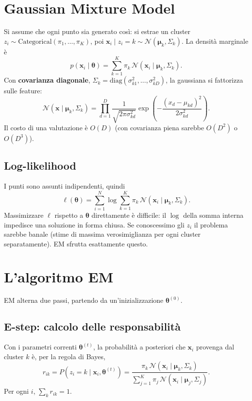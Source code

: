 \documentclass[11pt,a4paper]{article}
\newcommand{\bx}{\mathbf{x}}
\newcommand{\bmu}{\boldsymbol{\mu}}
\newcommand{\bth}{\boldsymbol{\theta}}
\newcommand{\Nrm}{\mathcal{N}}
\theoremstyle{definition}
\begin{document}
\section{Gaussian Mixture Model}
Si assume che ogni punto sia generato così: si estrae un cluster
$z_i\sim\mathrm{Categorical}(\pi_1,\dots,\pi_K)$, poi
$\bx_i\mid z_i=k\sim\Nrm(\bmu_k,\Sigma_k)$. La densità marginale è
\begin{equation}
p(\bx_i\mid\bth)=\sum_{k=1}^{K}\pi_k\,\Nrm(\bx_i\mid\bmu_k,\Sigma_k).
\end{equation}
Con \textbf{covarianza diagonale}, $\Sigma_k=\mathrm{diag}(\sigma_{k1}^2,\dots,\sigma_{kD}^2)$, la
gaussiana si fattorizza sulle feature:
\begin{equation}
\Nrm(\bx\mid\bmu_k,\Sigma_k)=\prod_{d=1}^{D}\frac{1}{\sqrt{2\pi\sigma_{kd}^2}}
\exp\!\left(-\frac{(x_d-\mu_{kd})^2}{2\sigma_{kd}^2}\right).
\label{eq:gauss}
\end{equation}
Il costo di una valutazione è $O(D)$ (con covarianza piena sarebbe $O(D^2)$ o
$O(D^3)$).

\subsection{Log-likelihood}
I punti sono assunti indipendenti, quindi
\begin{equation}
\ell(\bth)=\sum_{i=1}^{N}\log\sum_{k=1}^{K}\pi_k\,\Nrm(\bx_i\mid\bmu_k,\Sigma_k).
\label{eq:loglik}
\end{equation}
Massimizzare $\ell$ rispetto a $\bth$ direttamente è difficile: il $\log$ della
somma interna impedisce una soluzione in forma chiusa. Se conoscessimo gli $z_i$
il problema sarebbe banale (stime di massima verosimiglianza per ogni cluster
separatamente). EM sfrutta esattamente questo.

\section{L'algoritmo EM}
EM alterna due passi, partendo da un'inizializzazione $\bth^{(0)}$.

\subsection{E-step: calcolo delle responsabilità}
Con i parametri correnti $\bth^{(t)}$, la probabilità a posteriori che $\bx_i$
provenga dal cluster $k$ è, per la regola di Bayes,
\begin{equation}
r_{ik}=P(z_i=k\mid\bx_i,\bth^{(t)})=
\frac{\pi_k\,\Nrm(\bx_i\mid\bmu_k,\Sigma_k)}
{\sum_{j=1}^{K}\pi_j\,\Nrm(\bx_i\mid\bmu_j,\Sigma_j)}.
\label{eq:estep}
\end{equation}
Per ogni $i$, $\sum_k r_{ik}=1$.
\end{document}
